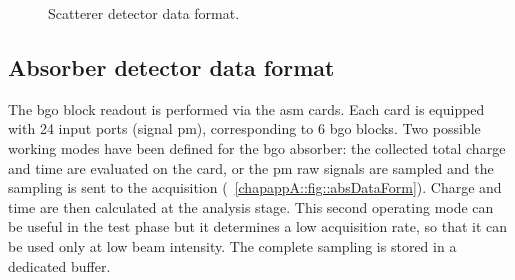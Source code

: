 \begin{figure}[htbp]
\caption{Scatterer detector data format.}
\label{chapappA::fig::scattDataForm}
\end{figure}

\subsection{Absorber detector data format}\label{chapappA::subsec::absDataFormat}
The \gls{bgo} block readout is performed via the \gls{asm} cards. Each card is equipped with 24 input ports (signal \gls{pm}), corresponding to 6 \gls{bgo} blocks. Two possible working modes have been defined for the \gls{bgo} absorber: the collected total charge and time are evaluated on the card, or the \gls{pm} raw signals are sampled and the sampling is sent to the acquisition (\figurename~\ref{chapappA::fig::absDataForm}). Charge and time are then calculated at the analysis stage. This second operating mode can be useful in the test phase but it determines a low acquisition rate, so that it can be used only at low beam intensity.\newline
The complete sampling is stored in a dedicated buffer.

